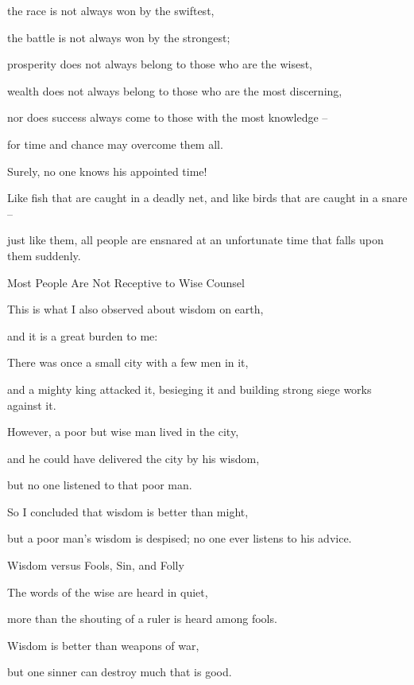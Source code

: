 {\par }{\Q the race
is not
always won by the swiftest,
\par }{\Q the battle
is not
always won by the strongest;
\par }{\Q prosperity
does not
always belong to those who are the wisest,
\par }{\Q wealth
does not
always belong to those who are the most discerning,
\par }{\Q nor
does success
always come to those with the most knowledge
–
\par }{\Q for
time
and chance
may overcome
them all.
\par }{\Q {}Surely,
no
one
knows
his appointed time!

\par }{\Q Like fish
that are caught
in a deadly
net,
and like birds
that are caught
in a snare
–
\par }{\Q just like them,
all people
are ensnared
at an unfortunate
time
that falls
upon
them suddenly.
\par }{\SH Most People Are Not Receptive to Wise Counsel
\par }{\Q {}This
is what I also
observed
about wisdom
on earth,
\par }{\Q and it is a great
burden to me:
\par }{\Q {}There was once a small
city
with a few
men
in it,
\par }{\Q and a mighty king
attacked
it, besieging
it and building
strong
siege works
against it.
\par }{\Q {}However,
a poor
but wise
man
lived in the city,

\par }{\Q and he could have delivered
the city
by his wisdom,
\par }{\Q but no
one
listened
to that poor
man.
\par }{\Q {}So I
concluded that wisdom
is better
than might,
\par }{\Q but a poor
man’s wisdom
is despised;
no
one ever listens
to his advice.
\par }{\SH Wisdom versus Fools, Sin, and Folly
\par }{\Q {}The words
of the wise
are heard
in quiet,
\par }{\Q more than the shouting
of a ruler
is heard among fools.
\par }{\Q {}Wisdom
is better
than weapons
of war,
\par }{\Q but one
sinner
can destroy
much
that is good.

}
